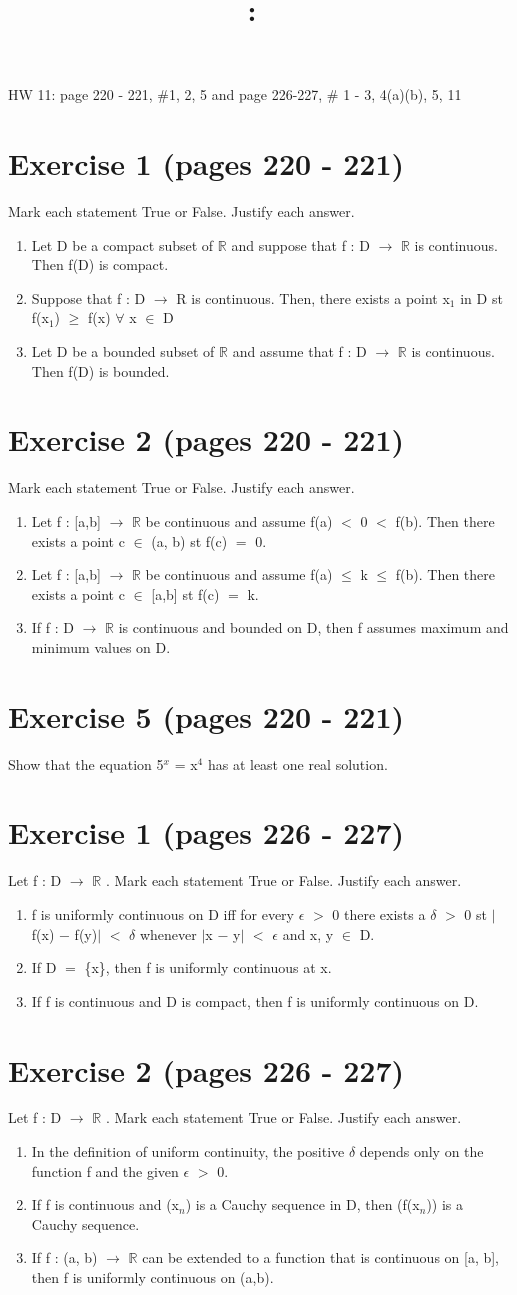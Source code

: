 \documentclass{article}
\title{
    \vspace{2in}
    \textmd{\textbf{\hmwkClass:\ \hmwkTitle}}\\
    \normalsize\vspace{0.1in}\small\vspace{0.1in}\large{\textit{\hmwkClassInstructor}}
    \vspace{3in}
}
\author{\hmwkAuthorName}
\date{}
\newcommand{\mt}[1]{\ensuremath{#1}}
\newcommand\bsc[2][\DefaultOpt]{%
  \def\DefaultOpt{#2}%
  \section[#1]{#2}%
}
\newcommand{\balist}{\begin{enumerate}[label=\alph*.]}
\newcommand{\elist}{\end{enumerate}}
\newcommand{\br}{\mt{\mathbb{R}} }       %
\newcommand{\ep}{\mt{\epsilon} }         %
\newcommand{\fa}{\mt{\forall} }          %
\newcommand{\dta}{\mt{\delta} }
\newcommand{\mem}{\mt{\in} }
\newcommand{\lra}{ \mt{\longrightarrow} } %
\newcommand{\av}[1]{\mt{|}#1\mt{|}}  %
\newcommand{\bk}[1]{\{#1\}}
\newcommand{\ms}{\mt{-} }
\newcommand{\ls}{\mt{<} }
\newcommand{\gr}{\mt{>} }
\newcommand{\lse}{\mt{\leq} }
\newcommand{\gre}{\mt{\geq} }
\newcommand{\eql}{\mt{=} }
\newcommand{\uw}[2]{#1\mt{_{#2}}}
\newcommand{\uf}[2]{#1\mt{^{#2}}}
\begin{document}
HW 11: page 220 - 221, \#1, 2, 5 and page 226-227, \# 1 - 3, 4(a)(b), 5, 11

\bsc{Exercise 1 (pages 220 - 221)}{

Mark each statement True or False. Justify each answer.
\balist
\item Let D be a compact subset of \br and suppose that f : D \lra \br is continuous. Then f(D) is compact.
\item Suppose that f : D \lra R is continuous. Then, there exists a point \uw{x}{1} in D st f(\uw{x}{1}) \gre f(x) \fa x \mem D
\item Let D be a bounded subset of \br and assume that f : D \lra \br is continuous. Then f(D) is bounded.
\elist
}

\bsc{Exercise 2 (pages 220 - 221)}{

Mark each statement True or False. Justify each answer.

\balist
\item Let f : [a,b] \lra \br be continuous and assume f(a) \ls 0 \ls f(b). Then there exists a point c \mem (a, b) st f(c) \eql 0.
\item Let f : [a,b] \lra \br be continuous and assume f(a) \lse k \lse f(b). Then there exists a point c \mem [a,b] st f(c) \eql k.
\item If f : D \lra \br is continuous and bounded on D, then f assumes maximum and minimum values on D.
\elist
}

\bsc{Exercise 5 (pages 220 - 221)}{
Show that the equation \uf{5}{x} = \uf{x}{4} has at least one real solution.

}


\bsc{Exercise 1 (pages 226 - 227)}{

Let f : D \lra \br. Mark each statement True or False. Justify each answer.

\balist
\item f is uniformly continuous on D iff for every \ep \gr 0 there exists a \dta \gr 0 st \av{f(x) \ms f(y)} \ls \dta whenever \av{x \ms y} \ls \ep and x, y \mem D.
\item If D \eql \bk{x}, then f is uniformly continuous at x.
\item If f is continuous and D is compact, then f is uniformly continuous on D.
\elist
}

\bsc{Exercise 2 (pages 226 - 227)}{
Let f : D \lra \br. Mark each statement True or False. Justify each answer.
\balist
\item In the definition of uniform continuity, the positive \dta depends only on the function f and the given \ep \gr 0.
\item If f is continuous and (\uw{x}{n}) is a Cauchy sequence in D, then (f(\uw{x}{n})) is a Cauchy sequence.
\item If f : (a, b) \lra \br can be extended to a function that is continuous on [a, b], then f is uniformly continuous on (a,b).
\elist
}
\end{document}
